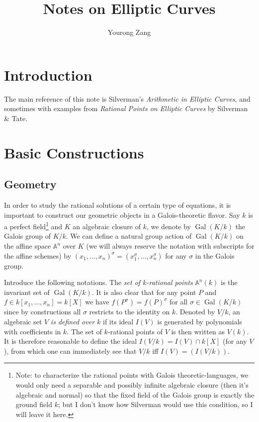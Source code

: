 \documentclass[12pt]{article}
\title{Notes on Elliptic Curves}
\author{Yourong Zang}
\theoremstyle{remark}
\newcommand{\s}[0]{\sigma}
\newcommand{\A}[0]{\mathbb{A}}
\newcommand{\Gal}[0]{\operatorname{Gal}}
\begin{document}
    \maketitle
    \tableofcontents
    \newpage
    \section{Introduction}\label{sec-intro}
        The main reference of this note is Silverman's \textit{Arithmetic in Elliptic Curves}, and sometimes with examples from \textit{Rational Points on Elliptic Curves} by Silverman \& Tate.

	\section{Basic Constructions}\label{sec-basic}
        \subsection{Geometry}\label{ssec-geometry-basic}
        In order to study the rational solutions of a certain type of equations, it is important to construct our geometric objects in a Galois-theoretic flavor. Say $k$ is a perfect field\footnote{Note: to characterize the rational points with Galois theoretic-languages, we would only need a separable and possibly infinite algebraic closure (then it's algebraic and normal) so that the fixed field of the Galois group is exactly the ground field $k$; but I don't know how Silverman would use this condition, so I will leave it here.} and $K$ an algebraic closure of $k$, we denote by $\Gal(K/k)$ the Galois group of $K/k$. We can define a natural group action of $\Gal(K/k)$ on the affine space $\A^n$ over $K$ (we will always reserve the notation with subscripts for the affine schemes) by $(x_1,\dots, x_n)^\s =(x_1^\s,\dots, x_n^\s)$ for any $\s$ in the Galois group.

        Introduce the following notations. The \textit{set of $k$-rational points} $\A^n(k)$ is the invariant set of $\Gal(K/k)$. It is also clear that for any point $P$ and $f\in k[x_1,\dots, x_n]=k[X]$ we have $f(P^\s)=f(P)^\s$ for all $\s\in\Gal(K/k)$ since by constructions all $\s$ restricts to the identity on $k$. Denoted by $V/k$, an algebraic set $V$ \textit{is defined over $k$} if its ideal $I(V)$ is generated by polynomials with coefficients in $k$. The set of $k$-rational points of $V$ is then written as $V(k)$. It is therefore reasonable to define the ideal $I(V/k)=I(V)\cap k[X]$ (for any $V$), from which one can immediately see that $V/k$ iff $I(V)=\left(I(V/k)\right)$.
\end{document}
